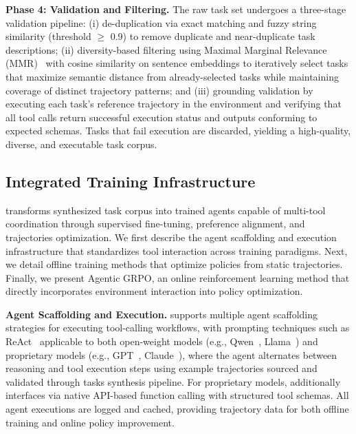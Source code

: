 \documentclass{article}
\theoremstyle{plain}
\theoremstyle{definition}
\theoremstyle{remark}
\begin{document}
\textbf{Phase 4: Validation and Filtering.}
The raw task set undergoes a three-stage validation pipeline: (i) de-duplication via exact matching and fuzzy string similarity (threshold $\geq$ 0.9) to remove duplicate and near-duplicate task descriptions; (ii) diversity-based filtering using Maximal Marginal Relevance (MMR)~\cite{goldstein1998summarization} with cosine similarity on sentence embeddings to iteratively select tasks that maximize semantic distance from already-selected tasks while maintaining coverage of distinct trajectory patterns; and (iii) grounding validation by executing each task's reference trajectory in the environment and verifying that all tool calls return successful execution status and outputs conforming to expected schemas. Tasks that fail execution are discarded, yielding a high-quality, diverse, and executable task corpus.


\vspace{-0.2cm}
\subsection{Integrated Training Infrastructure}
\label{sec:scapia-training}
\vspace{-0.2cm}
\name{} transforms synthesized task corpus into trained agents capable of multi-tool coordination through supervised fine-tuning, preference alignment, and trajectories optimization. We first describe the agent scaffolding and execution infrastructure that standardizes tool interaction across training paradigms. Next, we detail offline training methods that optimize policies from static trajectories. Finally, we present Agentic GRPO, an online reinforcement learning method that directly incorporates environment interaction into policy optimization.

\textbf{Agent Scaffolding and Execution.}
\label{sec:scaffolds}
\name{} supports multiple agent scaffolding strategies for executing tool-calling workflows, with prompting techniques such as ReAct~\cite{yao2022react} applicable to both open-weight models (e.g., Qwen~\cite{yang2025qwen3}, Llama~\cite{touvron2023llama}) and proprietary models (e.g., GPT~\cite{gpt5_o3}, Claude~\cite{claude_sonnet}), where the agent alternates between reasoning and tool execution steps using example trajectories sourced and validated through tasks synthesis pipeline. For proprietary models, \name{} additionally interfaces via native API-based function calling with structured tool schemas. All agent executions are logged and cached, providing trajectory data for both offline training and online policy improvement.
\end{document}
